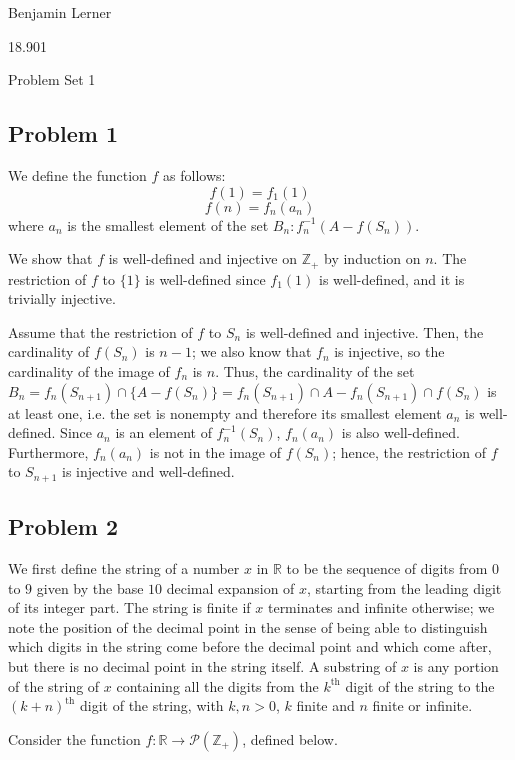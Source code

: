 \documentclass[12 pt]{article}
\begin{document}
\thispagestyle{plain}
Benjamin Lerner

18.901

Problem Set 1

\subsection*{Problem 1}
We define the function $f$ as follows:\\
		$$f(1)=f_1(1)$$
		$$f(n)=f_n(a_n)$$
		where $a_n$ is the smallest element of the set $B_n:f_n^{-1}(A-f(S_n))$.
		
We show that $f$ is well-defined and injective on $\mathbb{Z}_+$ by induction on $n$.  The restriction of $f$ to $\{1\}$ is well-defined since $f_1(1)$ is well-defined, and it is trivially injective.

Assume that the restriction of $f$ to $S_n$ is well-defined and injective.  Then, the cardinality of $f(S_n)$ is $n-1$; we also know that $f_n$ is injective, so the cardinality of the image of $f_n$ is $n$.  Thus, the cardinality of the set $B_n=f_n(S_{n+1})\cap\{A-f(S_n)\}=f_n(S_{n+1})\cap A-f_n(S_{n+1})\cap f(S_n)$ is at least one, i.e. the set is nonempty and therefore its smallest element $a_n$ is well-defined.  Since $a_n$ is an element of $f_n^{-1}(S_n)$, $f_n(a_n)$ is also well-defined.  Furthermore, $f_n(a_n)$ is not in the image of $f(S_n)$; hence, the restriction of $f$ to $S_{n+1}$ is injective and well-defined.

\subsection*{Problem 2}
We first define the string of a number $x$ in $\mathbb{R}$ to be the sequence of digits from $0$ to $9$ given by the base $10$ decimal expansion of $x$, starting from the leading digit of its integer part.  The string is finite if $x$ terminates and infinite otherwise; we note the position of the decimal point in the sense of being able to distinguish which digits in the string come before the decimal point and which come after, but there is no decimal point in the string itself.  A substring of $x$ is any portion of the string of $x$ containing all the digits from the $k^\textrm{th}$ digit of the string to the $(k+n)^\textrm{th}$ digit of the string, with $k,n>0$, $k$ finite and $n$ finite or infinite.

\bigskip

Consider the function $f:\mathbb{R}\to\mathcal{P}(\mathbb{Z_+})$, defined below. 
\end{document}
